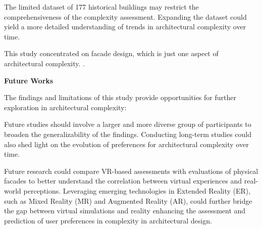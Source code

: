 
The limited dataset of 177 historical buildings may restrict the comprehensiveness of the complexity assessment.
Expanding the dataset could yield a more detailed understanding of trends in architectural complexity over time.

This study concentrated on facade design, which is just one aspect of architectural complexity. .


\textbf{Future Works}

The findings and limitations of this study provide opportunities for further exploration in architectural complexity:

Future studies should involve a larger and more diverse group of participants to broaden the generalizability of the findings.
Conducting long-term studies could also shed light on the evolution of preferences for architectural complexity over time.

Future research could compare VR-based assessments with evaluations of physical facades to better understand the correlation between virtual experiences and real-world perceptions.
Leveraging emerging technologies in Extended Reality (ER), such as Mixed Reality (MR) and Augmented Reality (AR), could further bridge the gap between virtual simulations and reality enhancing the assessment and prediction of user preferences in complexity in architectural design.


